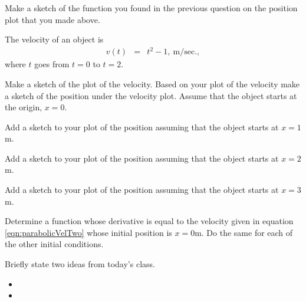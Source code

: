 \begin{problem}
\begin{subproblem}
    \vspace{3em}

    \vspace{3em}

  \item Make a sketch of the function you found in the previous
    question on the position plot that you made above.

  \end{subproblem}

  \clearpage

\item The velocity of an object is
  \begin{eqnarray}
    \label{eqn:parabolicVelTwo}
    v(t) & = & t^2  - 1, ~ \mathrm{m/sec.},
  \end{eqnarray}
  where $t$ goes from $t=0$ to $t=2$.

  \begin{subproblem}
  \item Make a sketch of the plot of the velocity.  Based on your plot
    of the velocity make a sketch of the position under the velocity
    plot. Assume that the object starts at the origin, $x=0$.

    \vfill

  \item Add a sketch to your plot of the position assuming that the object starts
    at $x=1$m.

  \item Add a sketch to your plot of the position assuming that the object starts
    at $x=2$m.

  \item Add a sketch to your plot of the position assuming that the object starts
    at $x=3$m.

  \item Determine a function whose derivative is equal to the velocity
    given in equation \ref{eqn:parabolicVelTwo} whose initial position
    is $x=0$m. Do the same for each of the other initial conditions.

    \vspace{3em}

  \end{subproblem}

\postClass

\begin{problem}
\item Briefly state two ideas from today's class.
  \begin{itemize}
  \item
  \item
  \end{itemize}


\end{problem}
\end{problem}

